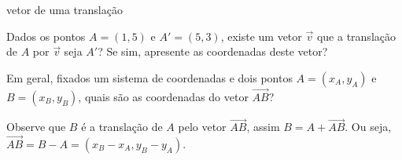 \begin{task}{ vetor de uma translação}
\label{ativ-vetores-coord-extremidades}

Dados os pontos \(A = (1, 5)\) e \(A' = (5, 3)\), existe um vetor  \(\vec{v}\) que a translação de \(A\) por \(\vec{v}\) seja \(A'\)? Se sim, apresente as coordenadas deste vetor?
\end{task}



Em geral, fixados um sistema de coordenadas e dois pontos \(A=(x_A,y_A)\) e \(B=(x_B,y_B)\), quais são as coordenadas do vetor \(\overrightarrow{AB}\)?

Observe que \(B\) é a translação de \(A\) pelo vetor \(\overrightarrow{AB}\), assim \(B=A + \overrightarrow{AB}\). Ou seja, \(\overrightarrow{AB} = B-A = (x_B - x_A, y_B - y_A)\).
\begin{center}
\end{center}\label{\detokenize{GE101-1A:ativ-vetores-alg-vetores-iguais}}
% 

